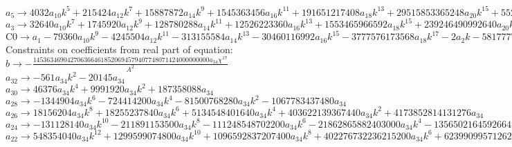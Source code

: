 \documentclass[12pt,a4paper,draft]{article}
\begin{document}
$a_{5}\to 4032 a_{10} k^5+215424 a_{12} k^7+15887872 a_{14} k^9+1545363456 a_{16} k^{11}+191651217408 a_{18} k^{13}+29515853365248 a_{20} k^{15}+5526593941929984 a_{22} k^{17}+1236393972835811328 a_{24} k^{19}+325709541934503034880 a_{26} k^{21}+99795859565893449154560 a_{28} k^{23}+35187792455985778913181696 a_{30} k^{25}+14146986524595818866380111872 a_{32} k^{27}+6433051715363147456977060233216 a_{34} k^{29}+6 a_{6} k+112 a_{8} k^3$\\
$a_{3}\to 32640 a_{10} k^7+1745920 a_{12} k^9+128780288 a_{14} k^{11}+12526223360 a_{16} k^{13}+1553465966592 a_{18} k^{15}+239246490992640 a_{20} k^{17}+44796883073761280 a_{22} k^{19}+10021832059523170304 a_{24} k^{21}+2640102104917816115200 a_{26} k^{23}+808914769103121354326016 a_{28} k^{25}+285221502512012477144760320 a_{30} k^{27}+114671153571535605293708738560 a_{32} k^{29}+52144353138637013068286135369728 a_{34} k^{31}+4 a_{4} k+40 a_{6} k^3+896 a_{8} k^5$\\
$\text{C0}\to a_{1}-79360 a_{10} k^9-4245504 a_{12} k^{11}-313155584 a_{14} k^{13}-30460116992 a_{16} k^{15}-3777576173568 a_{18} k^{17}-2 a_{2} k-581777702256640 a_{20} k^{19}-108932957168730112 a_{22} k^{21}-24370173276164456448 a_{24} k^{23}-6419958484945407574016 a_{26} k^{25}-1967044844910430876860416 a_{28} k^{27}-693575525634287935244206080 a_{30} k^{29}-278846808228005417477465964544 a_{32} k^{31}-126799861926498005417315327279104 a_{34} k^{33}-8 a_{4} k^3-96 a_{6} k^5-2176 a_{8} k^7$\\
Constraints on coefficients from real part of equation:
\\$b\to -\frac{1453634690427063664618520694579407748071424000000000 a_{34} \chi ^{17}}{A^2}$\\
$a_{32}\to -561 a_{34} k^2-20145 a_{34}$\\
$a_{30}\to 46376 a_{34} k^4+9991920 a_{34} k^2+187358088 a_{34}$\\
$a_{28}\to -1344904 a_{34} k^6-724414200 a_{34} k^4-81500768280 a_{34} k^2-1067783437480 a_{34}$\\
$a_{26}\to 18156204 a_{34} k^8+18255237840 a_{34} k^6+5134548401640 a_{34} k^4+403622139367440 a_{34} k^2+4173852814131276 a_{34}$\\
$a_{24}\to -131128140 a_{34} k^{10}-211891153500 a_{34} k^8-111248548702200 a_{34} k^6-21862865882403000 a_{34} k^4-1356502164592664700 a_{34} k^2-11867305220777904300 a_{34}$\\
$a_{22}\to 548354040 a_{34} k^{12}+1299599074800 a_{34} k^{10}+1096592837207400 a_{34} k^8+402276732236215200 a_{34} k^6+62399099571262576200 a_{34} k^4+3275376240934701586800 a_{34} k^2+25396918894137021431640 a_{34}$\\
\end{document}
